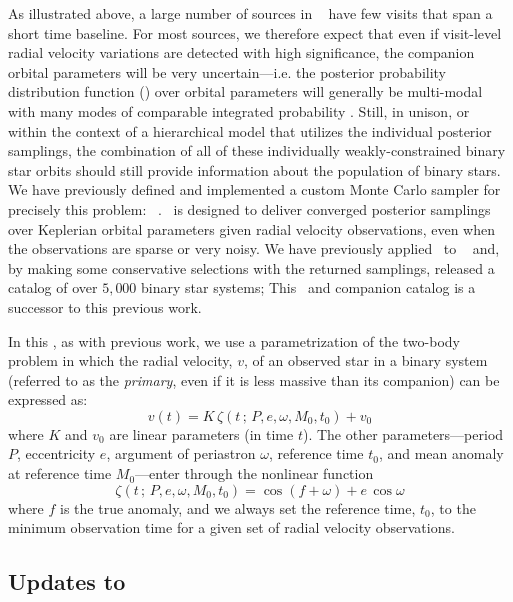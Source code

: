 \documentclass[modern]{aastex63}
\begin{document}
As illustrated above, a large number of sources in \apogee\  have few
visits that span a short time baseline.
For most sources, we therefore expect that even if visit-level radial velocity
variations are detected with high significance, the companion orbital parameters
will be very uncertain---i.e. the posterior probability distribution function
(\pdf) over orbital parameters will generally be multi-modal with many
modes of comparable integrated probability \citep[e.g.,][]{thejoker}.
Still, in unison, or within the context of a hierarchical model that utilizes
the individual posterior samplings, the combination of all of these individually
weakly-constrained binary star orbits should still provide information about the
population of binary stars.
We have previously defined and implemented a custom Monte Carlo sampler for
precisely this problem: \thejoker\ \citep{thejoker}.
\thejoker\ is designed to deliver converged posterior samplings over Keplerian
orbital parameters given radial velocity observations, even when the
observations are sparse or very noisy.
We have previously applied \thejoker\ to \apogee\ 
\citep{Price-Whelan:2018} and, by making some conservative selections with the
returned samplings, released a catalog of over $5,000$ binary star systems;
This \documentname\ and companion catalog is a successor to this previous work.

In this \documentname, as with previous work, we use a parametrization of the
two-body problem in which the radial velocity, $v$, of an observed star in a
binary system (referred to as the \emph{primary}, even if it is less massive
than its companion) can be expressed as:
\begin{equation}
    v(t) = K \, \zeta(t \,;\, P, e, \omega, M_0, t_0) + v_0 \label{eq:kepler}
\end{equation}
where $K$ and $v_0$ are linear parameters (in time $t$).
The other parameters---period $P$, eccentricity $e$, argument of periastron
$\omega$, reference time $t_0$, and mean anomaly at reference time $M_0$---enter
through the nonlinear function
\begin{equation}
    \zeta(t \,;\, P, e, \omega, M_0, t_0) = \cos\left(f + \omega\right) + e\,\cos\omega \label{eq:zeta}
\end{equation}
where $f$ is the true anomaly, and we always set the reference time, $t_0$, to
the minimum observation time for a given set of radial velocity observations.

\subsection{Updates to \thejoker}
\label{sec:joker-update}
\end{document}
